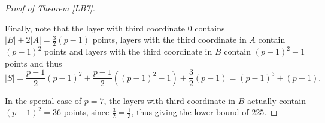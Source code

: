 \documentclass[12pt]{amsart}
\newcommand{\F}{{\mathbb F}}
\newcommand{\Z}{{\mathbb Z}}
\newcommand{\<}{\langle}
\renewcommand{\>}{\rangle}
\numberwithin{equation}{section}
\numberwithin{theorem}{section}
\begin{document}
\begin{proof}[Proof of Theorem \ref{LB7}]
\begin{itemize}
\end{itemize}


Finally, note that the layer with third coordinate $0$ contains $|B|+2|A|=\frac{3}{2}(p-1)$ points, layers with the third coordinate in $A$ contain $(p-1)^2$ points and layers with the third coordinate in $B$ contain $(p-1)^2-1$ points and thus $$|S|=\frac{p-1}{2}(p-1)^2+\frac{p-1}{2}((p-1)^2-1)+\frac{3}{2}(p-1)=(p-1)^3+(p-1).$$

In the special case of $p=7$, the layers with third coordinate in $B$ actually contain $(p-1)^2=36$ points, since $\frac{3}{2}=\frac{1}{3}$, thus giving the lower bound of $225$.

\end{proof}





















\end{document}
